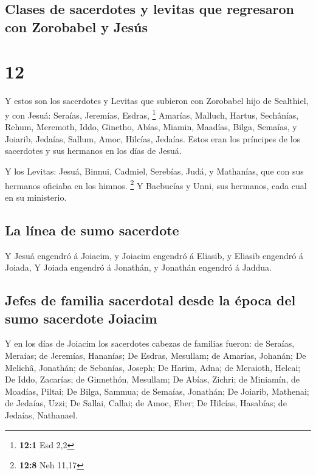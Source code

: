\hypertarget{clases-de-sacerdotes-y-levitas-que-regresaron-con-zorobabel-y-jesuxfas}{%
\subsection{Clases de sacerdotes y levitas que regresaron con Zorobabel
y
Jesús}\label{clases-de-sacerdotes-y-levitas-que-regresaron-con-zorobabel-y-jesuxfas}}

\hypertarget{section-11}{%
\section{12}\label{section-11}}

 Y estos son los sacerdotes y Levitas que subieron con
Zorobabel hijo de Sealthiel, y con Jesuá: Seraías, Jeremías, Esdras,
\footnote{\textbf{12:1} Esd 2,2}  Amarías, Malluch, Hartus,
 Sechânías, Rehum, Meremoth,  Iddo, Ginetho,
Abías,  Miamin, Maadías, Bilga,  Semaías, y
Joiarib, Jedaías,  Sallum, Amoc, Hilcías, Jedaías. Estos
eran los príncipes de los sacerdotes y sus hermanos en los días de
Jesuá.

 Y los Levitas: Jesuá, Binnui, Cadmiel, Serebías, Judá, y
Mathanías, que con sus hermanos oficiaba en los himnos. \footnote{\textbf{12:8}
  Neh 11,17}  Y Bacbucías y Unni, sus hermanos, cada cual en
su ministerio.

\hypertarget{la-luxednea-de-sumo-sacerdote}{%
\subsection{La línea de sumo
sacerdote}\label{la-luxednea-de-sumo-sacerdote}}

 Y Jesuá engendró á Joiacim, y Joiacim engendró á Eliasib,
y Eliasib engendró á Joiada,  Y Joiada engendró á Jonathán,
y Jonathán engendró á Jaddua.

\hypertarget{jefes-de-familia-sacerdotal-desde-la-uxe9poca-del-sumo-sacerdote-joiacim}{%
\subsection{Jefes de familia sacerdotal desde la época del sumo
sacerdote
Joiacim}\label{jefes-de-familia-sacerdotal-desde-la-uxe9poca-del-sumo-sacerdote-joiacim}}

 Y en los días de Joiacim los sacerdotes cabezas de
familias fueron: de Seraías, Meraías; de Jeremías, Hananías;
 De Esdras, Mesullam; de Amarías, Johanán;  De
Melichâ, Jonathán; de Sebanías, Joseph;  De Harim, Adna; de
Meraioth, Helcai;  De Iddo, Zacarías; de Ginnethón,
Mesullam;  De Abías, Zichri; de Miniamín, de Moadías,
Piltai;  De Bilga, Sammua; de Semaías, Jonathán;
 De Joiarib, Mathenai; de Jedaías, Uzzi;  De
Sallai, Callai; de Amoc, Eber;  De Hilcías, Hasabías; de
Jedaías, Nathanael.

